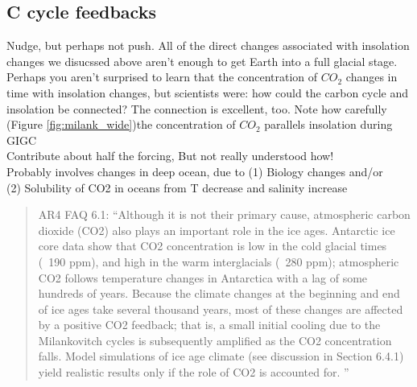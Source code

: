 \subsection{C cycle feedbacks}
Nudge, but perhaps not push. All of the direct changes associated with insolation changes we disucssed above aren't enough to get Earth into a full glacial stage. Perhaps you aren't surprised to learn that the concentration of $CO_2$ changes in time with insolation changes, but scientists were: how could the carbon cycle and insolation be connected? The connection is excellent, too. Note how carefully (Figure \ref{fig:milank_wide})the concentration of $CO_2$ parallels insolation during GIGC \\  
Contribute about half the forcing, But not really understood how!\\
Probably involves changes in deep ocean, due to (1) Biology changes and/or\\
(2) Solubility of CO2 in oceans from T decrease and salinity increase \\
\begin{quotation}
	AR4 FAQ 6.1: ``Although it is not their primary cause, atmospheric carbon dioxide (CO2) also plays an important role in the ice ages. Antarctic ice core data show that CO2 concentration is low in the cold glacial times (~190 ppm), and high in the warm interglacials (~280 ppm); atmospheric CO2 follows temperature changes in Antarctica with a lag of some hundreds of years. Because the climate changes at the beginning and end of ice ages take several thousand years, most of these changes are affected by a positive CO2 feedback; that is, a small initial cooling due to the Milankovitch cycles is subsequently amplified as the CO2 concentration falls. Model simulations of ice age climate (see discussion in Section 6.4.1) yield realistic results only if the role of CO2 is accounted for. ''
\end{quotation}
